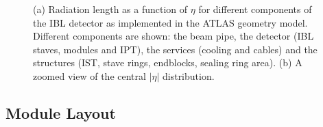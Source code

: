\begin{figure}
	\centering
	\caption{(a) Radiation length as a function of $\eta$  for different components of the IBL detector as implemented in the ATLAS geometry model. Different components are shown:  the beam pipe,  the detector  (IBL staves, modules and IPT),  the services (cooling and cables) and  the structures (IST, stave rings, endblocks, sealing ring area). (b) A zoomed view of the central  $|\eta|$ distribution.}
\label{fig:IBLMaterialBudget}
\end{figure}






\subsection{Module Layout}


